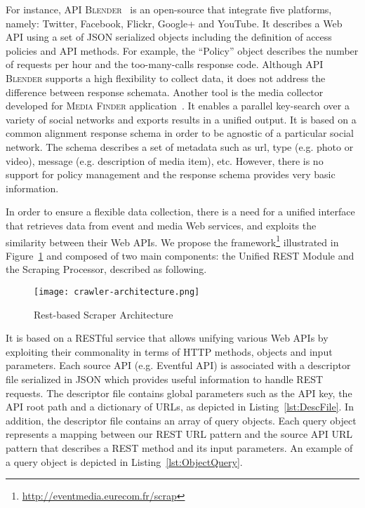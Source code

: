 For instance, \textsc{API Blender}~\cite{Gouriten:WWW12} is an open-source that integrate five platforms, namely: Twitter, Facebook, Flickr, Google+ and YouTube. It describes a Web API using a set of JSON serialized objects including the definition of access policies and API methods. For example, the ``Policy'' object describes the number of requests per hour and the too-many-calls response code. Although \textsc{API Blender} supports a high flexibility to collect data, it does not address the difference between response schemata. Another tool is the media collector developed for \textsc{Media Finder} application~\cite{Rizzo:SAM12}. It enables a parallel key-search over a variety of social networks and exports results in a unified output. It is based on a common alignment response schema in order to be agnostic of a particular social network. The schema describes a set of metadata such as url, type (e.g. photo or video), message (e.g. description of media item), etc. However, there is no support for policy management and the response schema provides very basic information. 

In order to ensure a flexible data collection, there is a need for a unified interface that retrieves data from event and media Web services, and exploits the similarity between their Web APIs. We propose the framework\footnote{\url{http://eventmedia.eurecom.fr/scrap}} illustrated in Figure~\ref{fig:crawler-architecture} and composed of two main components: the Unified REST Module and the Scraping Processor, described as following.

\begin{figure}[htbp]
  \centering
  \texttt{[image: crawler-architecture.png]}
  \caption{Rest-based Scraper Architecture}
  \label{fig:crawler-architecture}
\end{figure}

 It is based on a RESTful service that allows unifying various Web APIs by exploiting their commonality in terms of HTTP methods, objects and input parameters. Each source API (e.g. Eventful API) is associated with a descriptor file serialized in JSON which provides useful information to handle REST requests. The descriptor file contains global parameters such as the API key, the API root path and a dictionary of URLs, as depicted in Listing~\ref{lst:DescFile}. In addition, the descriptor file contains an array of query objects. Each query object represents a mapping between our REST URL pattern and the source API URL pattern that describes a REST method and its input parameters. An example of a query object is depicted in Listing~\ref{lst:ObjectQuery}. 

